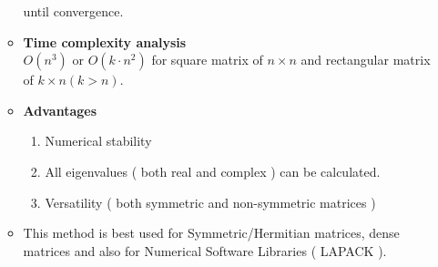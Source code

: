 \documentclass[report,12pt,onecolumn]{IEEEtran}
\theoremstyle{remark}
\begin{document}
\begin{itemize}
\begin{itemize}
					until convergence.
			\item \textbf{Time complexity analysis} \\
				$O(n^3)$ or $O(k \cdot n^2)$ for square matrix of $n \times n$ and rectangular matrix of $k \times n ( k > n )$.
			\item \textbf{Advantages} \\
				\begin{enumerate}
					\item Numerical stability
					\item All eigenvalues ( both real and complex ) can be calculated.
					\item Versatility ( both symmetric and non-symmetric matrices )
				\end{enumerate}
			\item This method is best used for Symmetric/Hermitian matrices, dense matrices and also for Numerical Software Libraries ( LAPACK ).
				
			\end{itemize}

\end{itemize}
\end{document}
